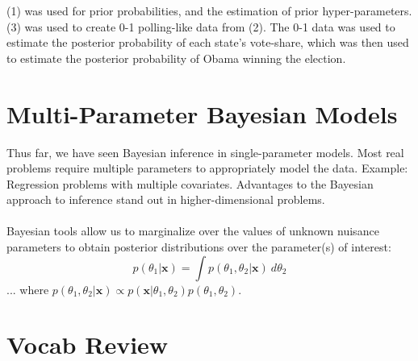 \documentclass[12pt]{book}
\begin{document}
\begin{center}
\end{center}



(1) was used for prior probabilities, and the estimation of prior hyper-parameters. (3) was used to create 0-1 polling-like data from (2). The 0-1 data was used to estimate the posterior probability of each state's vote-share, which was then used to estimate the posterior probability of Obama winning the election.



\section{Multi-Parameter Bayesian Models}
Thus far, we have seen Bayesian inference in single-parameter
models. Most real problems require multiple parameters to
appropriately model the data. Example: Regression problems with multiple covariates. Advantages to the Bayesian approach to inference stand out in higher-dimensional problems.
\\\\
Bayesian tools allow us to marginalize over the values of
unknown nuisance parameters to obtain posterior distributions
over the parameter(s) of interest:
\begin{equation}
p(\theta_1|\textbf{x}) = \int p(\theta_1, \theta_2|\textbf{x}) \ d\theta_2
\end{equation}
... where $p(\theta_1, \theta_2|\textbf{x}) \propto p(\textbf{x}|\theta_1, \theta_2)p(\theta_1, \theta_2)$.




\section{Vocab Review}
\end{document}
